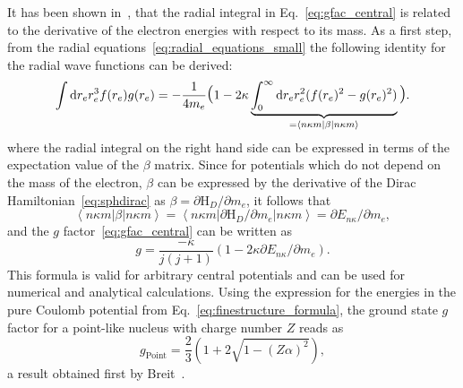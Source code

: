 It has been shown in~\cite{Karshenboim2005}, that the radial integral in Eq.~\eqref{eq:gfac_central} is related to the derivative of the electron energies with respect to its mass. As a first step, from the radial equations~\eqref{eq:radial_equations_small} the following identity for the radial wave functions can be derived:
\begin{equation}
\int\mathrm{d}r_e r_e^3 f(r_e)g(r_e) = -\frac{1}{4m_e}
\text{\Large(}1-2\kappa \underbrace{\int_0^\infty\mathrm{d}r_e r_e^2 (f(r_e)^2-g(r_e)^2)}_{=\left<n\kappa m\right|\beta\left|n\kappa m\right>}\text{\Large)}.
\end{equation}
where the radial integral on the right hand side can be expressed in terms of the expectation value of the $\beta$ matrix. Since for potentials which do not depend on the mass of the electron, $\beta$ can be expressed by the derivative of the Dirac Hamiltonian~\eqref{eq:sphdirac} as $\beta = \partial\text{H}_D/\partial m_e$, it follows that
\begin{equation}
\left<n\kappa m\right|\beta\left|n\kappa m\right> = \left<n\kappa m\right|\partial\text{H}_D/\partial m_e\left|n\kappa m\right> = \partial E_{n\kappa}/\partial m_e,
\end{equation}
and the $g$ factor~\eqref{eq:gfac_central} can be written as
\begin{equation}
g = \frac{-\kappa}{j(j+1)}\left( 1-2\kappa\partial E_{n\kappa}/\partial m_e\right).
\label{eq:gfac_viaDeriv}
\end{equation}
This formula is valid for arbitrary central potentials and can be used for numerical and analytical calculations. Using the expression for the energies in the pure Coulomb potential from Eq.~\eqref{eq:finestructure_formula}, the ground state $g$ factor for a point-like nucleus with charge number $Z$ reads as
\begin{equation}
\label{eq:point_gfac}
g_{\text{Point}}=\frac{2}{3}\left( 1+2\sqrt{1-(Z\alpha)^2}\right),
\end{equation}
a result obtained first by Breit~\cite{breit1928}.

